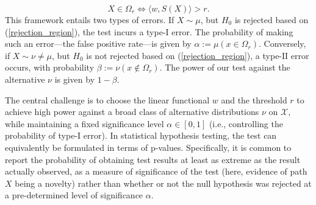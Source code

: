 \documentclass[twoside,11pt]{article}
\numberwithin{equation}{section}
\numberwithin{theorem}{section}
\newcommand{\X}{\mathcal{X}}
\begin{document}
\begin{equation}\label{rejection_region}
    X\in \Omega_r\iff \langle w, S(X)\rangle>r.
\end{equation}
This framework entails two types of errors. If $X\sim \mu$, but $H_0$ is rejected based on (\ref{rejection_region}), the test incurs a type-$\mathrm{I}$ error. The probability of making such an error---the false positive rate---is given by $\alpha:=\mu(x\in \Omega_r)$. Conversely, if $X\sim \nu\neq \mu$, but $H_0$ is not rejected based on (\ref{rejection_region}), a type-$\mathrm{II}$ error occurs, with probability $\beta:=\nu(x\not\in \Omega_r)$. The power of our test against the alternative $\nu$ is given by $1-\beta$.

The central challenge is to choose the linear functional $w$ and the threshold $r$ to achieve high power against a broad class of alternative distributions $\nu$ on $\X$, while maintaining a fixed significance level $\alpha\in[0,1]$ (i.e., controlling the probability of type-$\mathrm{I}$ error). 
In statistical hypothesis testing, the test can equivalently be formulated in terms of p-values. Specifically, it is common to report the probability of obtaining test results at least as extreme as the result actually observed, as a measure of significance of the test (here, evidence of path $X$ being a novelty) rather than whether or not the null hypothesis was rejected at a pre-determined level of significance $\alpha$. 
\end{document}
